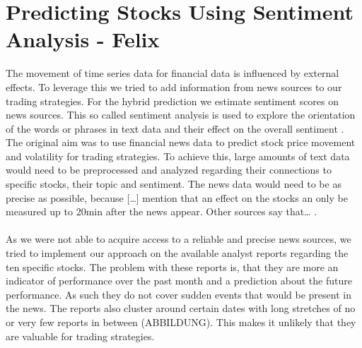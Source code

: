 \chapter{Predicting Stocks Using Sentiment Analysis - Felix} \label{ch:predictions_ml}
The movement of time series data for financial data is influenced by external effects. To leverage this we tried to add information from news sources to our trading strategies. For the hybrid prediction we estimate sentiment scores on news sources. This so called sentiment analysis is used to explore the orientation of the words or phrases in text data and their effect on the overall sentiment \citep{HADDI201326}. The original aim was to use financial news data to predict stock price movement and volatility for trading strategies. To achieve this, large amounts of text data would need to be preprocessed and analyzed regarding their connections to specific stocks, their topic and sentiment. The news data would need to be as precise as possible, because […] mention that an effect on the stocks an only be measured up to 20min after the news appear. Other sources say that… .
\\ \\
As we were not able to acquire access to a reliable and precise news sources, we tried to implement our approach on the available analyst reports regarding the ten specific stocks. The problem with these reports is, that they are more an indicator of performance over the past month and a prediction about the future performance. As such they do not cover sudden events that would be present in the news. The reports also cluster around certain dates with long stretches of no or very few reports in between (ABBILDUNG). This makes it unlikely that they are valuable for trading strategies.
%    
\\  \\
